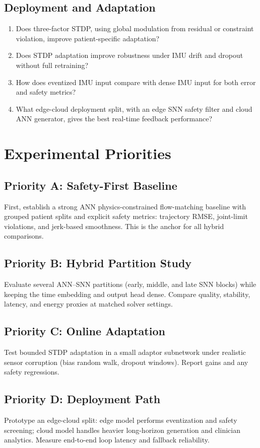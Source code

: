 \documentclass[11pt]{article}
\begin{document}
\subsection*{Deployment and Adaptation}
\begin{enumerate}
  \item Does three-factor STDP, using global modulation from residual or constraint violation, improve patient-specific adaptation?
  \item Does STDP adaptation improve robustness under IMU drift and dropout without full retraining?
  \item How does eventized IMU input compare with dense IMU input for both error and safety metrics?
  \item What edge-cloud deployment split, with an edge SNN safety filter and cloud ANN generator, gives the best real-time feedback performance?
\end{enumerate}

\section{Experimental Priorities}
\subsection*{Priority A: Safety-First Baseline}
First, establish a strong ANN physics-constrained flow-matching baseline with grouped patient splits and explicit safety metrics: trajectory RMSE, joint-limit violations, and jerk-based smoothness. This is the anchor for all hybrid comparisons.

\subsection*{Priority B: Hybrid Partition Study}
Evaluate several ANN--SNN partitions (early, middle, and late SNN blocks) while keeping the time embedding and output head dense. Compare quality, stability, latency, and energy proxies at matched solver settings.

\subsection*{Priority C: Online Adaptation}
Test bounded STDP adaptation in a small adaptor subnetwork under realistic sensor corruption (bias random walk, dropout windows). Report gains and any safety regressions.

\subsection*{Priority D: Deployment Path}
Prototype an edge-cloud split: edge model performs eventization and safety screening; cloud model handles heavier long-horizon generation and clinician analytics. Measure end-to-end loop latency and fallback reliability.
\end{document}
